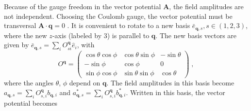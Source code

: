 \documentclass{article}
\begin{document}
Because of the gauge freedom in the vector potential  $\textbf{A}$, the field amplitudes are not independent.  Choosing the Coulomb gauge, the vector potential must be transversal $\textbf{A} \cdot \textbf{q} = 0$ . It is convenient to rotate to a new basis $\bar{e}_{\textbf{q}, s}, s \in (1,2,3)$, where the new $z$-axis (labeled by $3$) is parallel to $\textbf{q}$. The new basis vectors are given by $\bar{e}_{\textbf{q}, s} = \sum_i O^{\textbf{q}}_{si} \hat{e}_i $, with
\begin{equation}
    O^{\textbf{q}} = \begin{pmatrix} 
    \cos{\theta}\cos{\phi} & \cos{\theta}\sin{\phi} & - \sin{\theta} \\ 
    -\sin{\phi}            & \cos{\phi}             & 0 \\
    \sin{\phi}\cos{\phi}   & \sin{\theta}\sin{\phi} & \cos{\theta}
    \end{pmatrix}\;,
\end{equation}
where the angles $\theta$, $\phi$ depend on $\textbf{q}$. The field amplitudes in this basis become $a_{\textbf{q},s} = \sum_i O^{\textbf{q}}_{s,i} b_{\textbf{q}, i}$ and $a_{\textbf{q},s}^{*} = \sum_i O^{\textbf{q}}_{s,i} b_{\textbf{q}, i}^{*}$. Written in this basis, the vector potential becomes
\end{document}
